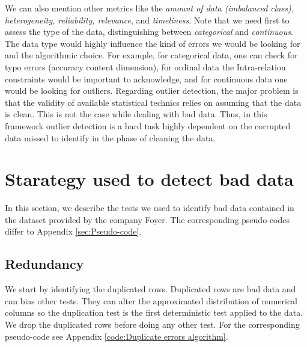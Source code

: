 \documentclass{article}
\begin{document}
We can also mention other metrics like the \textit{amount of data (imbalanced class), heterogeneity, reliability, relevance}, and \textit{timeliness}.
Note that we need first to assess the type of the data, distinguishing between \textit{categorical} and \textit{continuous}.
The data type would highly influence the kind of errors we would be looking for and the algorithmic choice.
For example, for categorical data, one can check for typo errors (accuracy content dimension), for ordinal data the Intra-relation constraints would be important to acknowledge, and for continuous data one would be looking for outliers.
Regarding outlier detection, the major problem is that the validity of available statistical technics relies on assuming that the data is clean.
This is not the case while dealing with bad data.
Thus, in this framework outlier detection is a hard task highly dependent on the corrupted data missed to identify in the phase of cleaning the data.
\section{Starategy used to detect bad data}
\label{sec:Starategy used to detect bad data}
In this section, we describe the tests we used to identify bad data contained in the dataset provided by the company Foyer.
The corresponding pseudo-codes differ to Appendix \ref{sec:Pseudo-code}.

\subsection{Redundancy} %
\label{sub:Redundancy}
We start by identifying the duplicated rows.
Duplicated rows are bad data and can bias other tests.
They can alter the approximated distribution of numerical columns so the duplication test is the first deterministic test applied to the data.
We drop the duplicated rows before doing any other test.
For the corresponding pseudo-code see Appendix \ref{code:Duplicate errors algorithm}.
\end{document}

